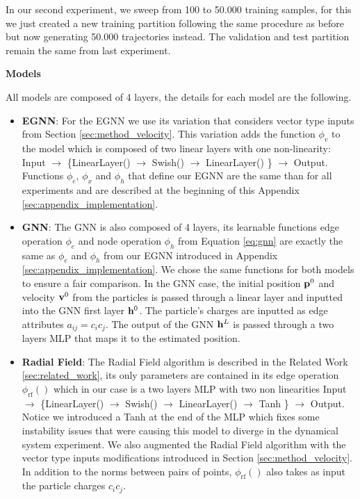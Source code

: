 In our second experiment, we sweep from 100 to 50.000 training samples, for this we just created a new training partition following the same procedure as before but now generating 50.000 trajectories instead. The validation and test partition remain the same from last experiment.

\textbf{Models}

All models are composed of 4 layers, the details for each model are the following.
\begin{itemize}
    \item \textbf{EGNN}: For the EGNN we use its variation that considers vector type inputs from Section \ref{sec:method_velocity}. This variation adds the function $\phi_v$ to the model which is composed of two linear layers with one non-linearity: Input $\xrightarrow{}$ \{LinearLayer() $\xrightarrow{}$ Swish() $\xrightarrow{}$ LinearLayer() \} $\xrightarrow{}$ Output. Functions $\phi_e$, $\phi_x$ and $\phi_h$ that define our EGNN are the same than for all experiments and are described at the beginning of this Appendix \ref{sec:appendix_implementation}.
    \item \textbf{GNN}: The GNN is also composed of 4 layers, its learnable functions edge operation $\phi_e$ and node operation $\phi_h$ from Equation \ref{eq:gnn} are exactly the same as $\phi_e$ and $\phi_h$ from our EGNN introduced in Appendix \ref{sec:appendix_implementation}. We chose the same functions for both models to ensure a fair comparison. In the GNN case, the initial position $\mathbf{p}^0$ and velocity $\mathbf{v}^0$ from the particles is passed through a linear layer and inputted into the GNN first layer $\mathbf{h}^0$. The particle's charges are inputted as edge attributes $a_{ij} = c_i c_j$. The output of the GNN $\mathbf{h}^L$ is passed through a two layers MLP that maps it to the estimated position.
    
    \item \textbf{Radial Field}: The Radial Field algorithm is described in the Related Work \ref{sec:related_work}, its only parameters are contained in its edge operation $\phi_{\mathrm{rf}}()$ which in our case is a two layers MLP with two non linearities Input $\xrightarrow{}$ \{LinearLayer() $\xrightarrow{}$ Swish() $\xrightarrow{}$ LinearLayer() $\xrightarrow{}$ Tanh \} $\xrightarrow{}$ Output. Notice we introduced a Tanh at the end of the MLP which fixes some instability issues that were causing this model to diverge in the dynamical system experiment. We also augmented the Radial Field algorithm with the vector type inputs modifications introduced in Section \ref{sec:method_velocity}. In addition to the norms between pairs of points, $\phi_{\mathrm{rf}}()$ also takes as input the particle charges $c_i c_j$.
    

\end{itemize}
